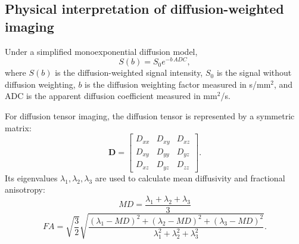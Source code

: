 \subsection{Physical interpretation of diffusion-weighted imaging}
Under a simplified monoexponential diffusion model,
\begin{equation}
S(b)=S_0 e^{-b\,ADC},
\end{equation}
where $S(b)$ is the diffusion-weighted signal intensity, $S_0$ is the signal without diffusion weighting, $b$ is the diffusion weighting factor measured in s/mm$^2$, and ADC is the apparent diffusion coefficient measured in mm$^2$/s.

For diffusion tensor imaging, the diffusion tensor is represented by a symmetric matrix:
\begin{equation}
\mathbf{D}=\begin{bmatrix}
D_{xx}&D_{xy}&D_{xz}\\
D_{xy}&D_{yy}&D_{yz}\\
D_{xz}&D_{yz}&D_{zz}
\end{bmatrix}.
\end{equation}
Its eigenvalues $\lambda_1,\lambda_2,\lambda_3$ are used to calculate mean diffusivity and fractional anisotropy:
\begin{equation}
MD=\frac{\lambda_1+\lambda_2+\lambda_3}{3}
\end{equation}
\begin{equation}
FA=\sqrt{\frac{3}{2}}\sqrt{\frac{(\lambda_1-MD)^2+(\lambda_2-MD)^2+(\lambda_3-MD)^2}{\lambda_1^2+\lambda_2^2+\lambda_3^2}}.
\end{equation}

